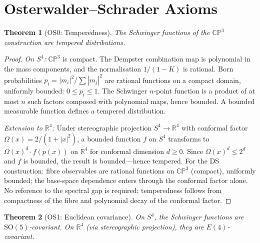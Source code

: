 \documentclass[11pt,a4paper]{article}
\newtheorem{theorem}{Theorem}[section]
\theoremstyle{definition}
\theoremstyle{remark}
\newcommand{\CP}{\mathbb{CP}}
\newcommand{\R}{\mathbb{R}}
\begin{document}
\section{Osterwalder--Schrader Axioms}\label{sec:OS}

\begin{theorem}[OS0: Temperedness]\label{thm:OS0}
The Schwinger functions of the $\CP^3$ construction are tempered distributions.
\end{theorem}

\begin{proof}
\emph{On $S^4$:} $\CP^3$ is compact. The Dempster combination map is polynomial in the mass components, and the normalisation $1/(1-K)$ is rational. Born probabilities $p_i=|m_i|^2/\sum|m_j|^2$ are rational functions on a compact domain, uniformly bounded: $0\leq p_i\leq 1$. The Schwinger $n$-point function is a product of at most $n$ such factors composed with polynomial maps, hence bounded. A bounded measurable function defines a tempered distribution.

\emph{Extension to $\R^4$:} Under stereographic projection $S^4\to\R^4$ with conformal factor $\Omega(x)=2/(1+|x|^2)$, a bounded function $f$ on $S^4$ transforms to $\Omega(x)^d\cdot f(p(x))$ on $\R^4$ for conformal dimension $d\geq 0$. Since $\Omega(x)^d\leq 2^d$ and $f$ is bounded, the result is bounded---hence tempered. For the DS construction: fibre observables are rational functions on $\CP^3$ (compact), uniformly bounded; the base-space dependence enters through the conformal factor alone. No reference to the spectral gap is required; temperedness follows from compactness of the fibre and polynomial decay of the conformal factor.
\end{proof}

\begin{theorem}[OS1: Euclidean covariance]\label{thm:OS1}
On $S^4$, the Schwinger functions are $\mathrm{SO}(5)$-covariant. On $\R^4$ (via stereographic projection), they are $E(4)$-covariant.
\end{theorem}
\end{document}
